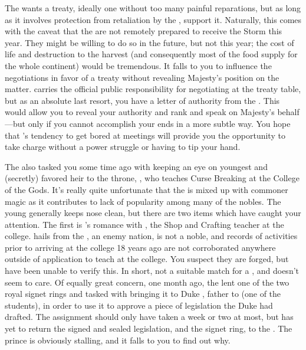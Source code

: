 \documentclass[char]{GL2020}
\begin{document}
The \cQueen{\Majesty} wants a treaty, ideally one without too many painful reparations, but as long as it involves protection from retaliation by the \pTech{}, \cQueen{\they} support it. Naturally, this comes with the caveat that the \pFarm{} are not remotely prepared to receive the Storm this year. They might be willing to do so in the future, but not this year; the cost of life and destruction to the harvest (and consequently most of the food supply for the whole continent) would be tremendous. It falls to you to influence the negotiations in favor of a treaty without revealing \cQueen{\Their} Majesty's position on the matter. \cEvil{} carries the official public responsibility for negotiating at the treaty table, but as an absolute last resort, you have a letter of authority from the \cQueen{\Majesty}. This would allow you to reveal your authority and rank and speak on \cQueen{\their} Majesty's behalf---but only if you cannot accomplish your ends in a more subtle way. You hope that \cEvil{}'s tendency to get bored at meetings will provide you the opportunity to take charge without a power struggle or having to tip your hand.

The \cQueen{\Majesty} also tasked you some time ago with keeping an eye on \cQueen{\their} youngest \cPrince{\child} and (secretly) favored heir to the throne, \cPrince{\full}, who teaches Curse Breaking at the College of the Gods. It's really quite unfortunate that the \cPrince{\Heir} is mixed up with commoner magic as it contributes to \cPrince{\their} lack of popularity among many of the nobles. The young \cPrince{\heir} generally keeps \cPrince{\their} nose clean, but there are two items which have caught your attention. The first is \cPrince{}'s romance with \cPirate{\full}, the Shop and Crafting teacher at the college. \cPirate{} hails from the \pShip{}, an enemy nation, is not a noble, and records of \cPirate{\their} activities prior to arriving at the college 18 years ago are not corroborated anywhere outside of \cPirate{\their} application to teach at the college. You suspect they are forged, but have been unable to verify this. In short, \cPirate{\theyare} not a suitable match for a \cPrince{\heir}, and \cPrince{} doesn't seem to care. Of equally great concern, one month ago, the \cQueen{\Majesty} lent \cPrince{} one of the two royal signet rings and tasked \cPrince{\them} with bringing it to Duke \cChupStudent{\formal}, father to \cChupStudent{\full} (one of the students), in order to use it to approve a piece of legislation the Duke had drafted. The assignment should only have taken a week or two at most, but \cPrince{} has yet to return the signed and sealed legislation, and the signet ring, to the \cQueen{\Majesty}. The prince is obviously stalling, and it falls to you to find out why.
\end{document}
